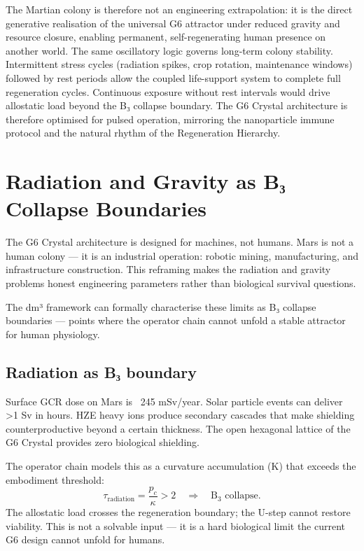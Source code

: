 \documentclass[19pt]{book}
\theoremstyle{plain}
\theoremstyle{definition}
\theoremstyle{remark}
\begin{document}
The Martian colony is therefore not an engineering extrapolation: it is the direct generative realisation of the universal G6 attractor under reduced gravity and resource closure, enabling permanent, self-regenerating human presence on another world. 
The same oscillatory logic governs long-term colony stability. Intermittent stress cycles (radiation spikes, crop rotation, maintenance windows) followed by rest periods allow the coupled life-support system to complete full regeneration cycles. Continuous exposure without rest intervals would drive allostatic load beyond the B₃ collapse boundary. The G6 Crystal architecture is therefore optimised for pulsed operation, mirroring the nanoparticle immune protocol and the natural rhythm of the Regeneration Hierarchy.

\chapter{Radiation and Gravity as B₃ Collapse Boundaries}

The G6 Crystal architecture is designed for machines, not humans. Mars is not a human colony — it is an industrial operation: robotic mining, manufacturing, and infrastructure construction. This reframing makes the radiation and gravity problems honest engineering parameters rather than biological survival questions.

The dm³ framework can formally characterise these limits as B₃ collapse boundaries — points where the operator chain cannot unfold a stable attractor for human physiology.

\section{Radiation as B₃ boundary}

Surface GCR dose on Mars is ~245 mSv/year. Solar particle events can deliver >1 Sv in hours. HZE heavy ions produce secondary cascades that make shielding counterproductive beyond a certain thickness. The open hexagonal lattice of the G6 Crystal provides zero biological shielding.

The operator chain models this as a curvature accumulation (K) that exceeds the embodiment threshold:
\[
\tau_{\text{radiation}} = \frac{p_c}{\kappa} > 2 \quad \Rightarrow \quad \text{B}_3 \text{ collapse}.
\]
The allostatic load crosses the regeneration boundary; the U-step cannot restore viability. This is not a solvable input — it is a hard biological limit the current G6 design cannot unfold for humans.
\end{document}
